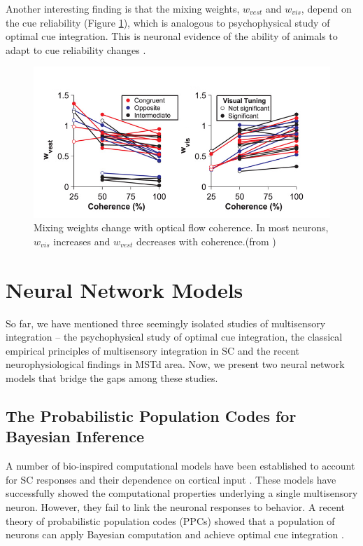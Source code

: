 \documentclass{article}[11pt]
\begin{document}
Another interesting finding is that the mixing weights, $w_{vest}$ and $w_{vis}$, depend on the cue reliability (Figure \ref{fig:weight}), which is analogous to psychophysical study of optimal cue integration.
This is neuronal evidence of the ability of animals to adapt to cue reliability changes .

\begin{figure}[tpb]
  \centering
  \includegraphics[width=.7\textwidth]{weight}
  \caption{Mixing weights change with optical flow coherence. In most neurons, $w_{vis}$ increases and $w_{vest}$ decreases with coherence.(from \cite{morgan_multisensory_2008})}
  \label{fig:weight}
\end{figure}


\section{Neural Network Models}
So far, we have mentioned three seemingly isolated studies of multisensory integration -- the psychophysical study of optimal cue integration, the classical empirical principles of multisensory integration in SC and the recent neurophysiological findings in MSTd area. Now, we present two neural network models that bridge the gaps among these studies.

\subsection{The Probabilistic Population Codes for Bayesian Inference}
A number of bio-inspired computational models have been established to account for SC responses and their dependence on cortical input \cite{patton_modeling_2003, alvarado_neural_2008}. These models have successfully showed the computational properties underlying a single multisensory neuron. However, they fail to link the neuronal responses to behavior. A recent theory of probabilistic population codes (PPCs) showed that a population of neurons can apply Bayesian computation and achieve optimal cue integration \cite{ma_bayesian_2006}.
\end{document}
